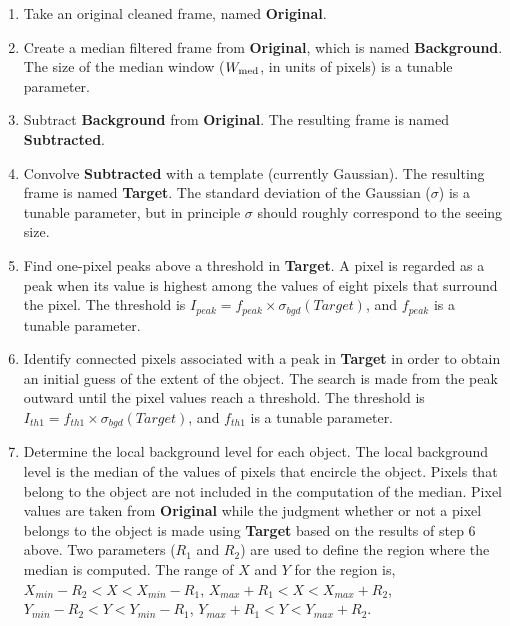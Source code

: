 \begin{enumerate}
\item Take an original cleaned frame, named {\bf Original}.

\item Create a median filtered frame from {\bf Original}, which is
      named {\bf Background}.
    The size of the median window ($W_{\rm med}$, in units of pixels)
    is a tunable parameter.

\item Subtract {\bf Background} from {\bf Original}. The resulting
    frame is named {\bf Subtracted}.

\item Convolve {\bf Subtracted} with a template (currently Gaussian).
    The resulting
    frame is named {\bf Target}. The standard deviation of the Gaussian
     ($\sigma$) is a tunable parameter, but in principle $\sigma$
     should roughly correspond to the seeing size.

\item Find one-pixel peaks above a threshold in {\bf Target}. A pixel is
    regarded as a peak when its value is highest among the values of 
    eight pixels that surround the pixel.
    The threshold is $I_{peak}=f_{peak}\times\sigma_{bgd}(Target)$,
    and $f_{peak}$ is a tunable parameter.

\item Identify connected pixels associated with a peak in {\bf Target} in 
    order to obtain an initial guess of the extent of the object.
    The search is made from the peak outward until the pixel values
    reach a threshold. The threshold  is
    $I_{th1}=f_{th1}\times\sigma_{bgd}(Target)$, and
    $f_{th1}$ is a tunable parameter. 
  
\item Determine the local background level for each object. The local
    background level is the median of the values of pixels that encircle
    the object. Pixels that belong to the object are not included
    in the computation of the median. Pixel values are taken from
    {\bf Original} while the judgment whether or not a pixel belongs
    to the object is made using {\bf Target} based on  the results of
    step 6 above.
    Two parameters ($R_1$ and $R_2$) are used to define the region
    where the median is computed. The range of $X$ and $Y$ for the
    region is, $X_{min}-R_2<X<X_{min}-R_1$, 
    $X_{max}+R_1<X<X_{max}+R_2$, $Y_{min}-R_2<Y<Y_{min}-R_1$,
    $Y_{max}+R_1<Y<Y_{max}+R_2$.



\end{enumerate}
